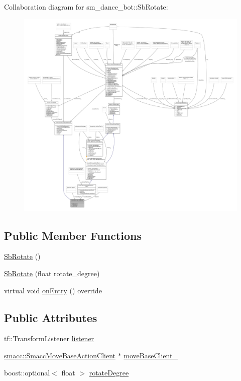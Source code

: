 Collaboration diagram for sm\+\_\+dance\+\_\+bot\+:\+:Sb\+Rotate\+:
\nopagebreak
\begin{figure}[H]
\begin{center}
\leavevmode
\includegraphics[width=350pt]{classsm__dance__bot_1_1SbRotate__coll__graph}
\end{center}
\end{figure}
\subsection*{Public Member Functions}
\begin{DoxyCompactItemize}
\item 
\hyperlink{classsm__dance__bot_1_1SbRotate_aedb67014d287510b3742c75bf0eabdf7}{Sb\+Rotate} ()
\item 
\hyperlink{classsm__dance__bot_1_1SbRotate_ac18f0c337926d04e208e5e7fb897980b}{Sb\+Rotate} (float rotate\+\_\+degree)
\item 
virtual void \hyperlink{classsm__dance__bot_1_1SbRotate_a01be8c8a42cc62c70a2a06b539a46e03}{on\+Entry} () override
\end{DoxyCompactItemize}
\subsection*{Public Attributes}
\begin{DoxyCompactItemize}
\item 
tf\+::\+Transform\+Listener \hyperlink{classsm__dance__bot_1_1SbRotate_ab3fcf762bb8d5a5ada2fa3624403ec66}{listener}
\item 
\hyperlink{classsmacc_1_1SmaccMoveBaseActionClient}{smacc\+::\+Smacc\+Move\+Base\+Action\+Client} $\ast$ \hyperlink{classsm__dance__bot_1_1SbRotate_a7b8658c9d207a3b88c97d77f718bd4ad}{move\+Base\+Client\+\_\+}
\item 
boost\+::optional$<$ float $>$ \hyperlink{classsm__dance__bot_1_1SbRotate_a43e1c845c2cd8f5ba2fbcc03abc91d34}{rotate\+Degree}
\end{DoxyCompactItemize}


